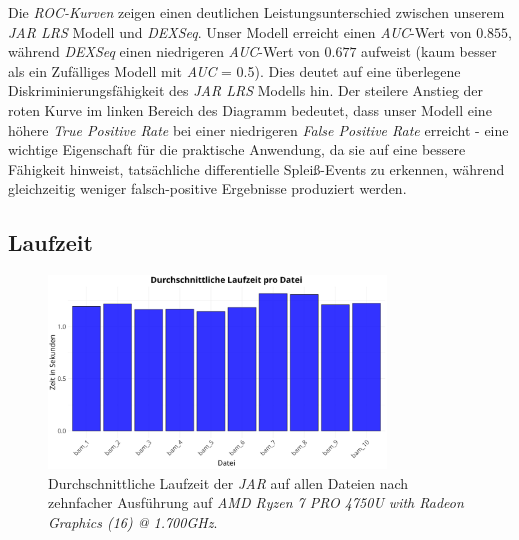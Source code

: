 \documentclass[12pt]{article}
\begin{document}
Die \textit{ROC-Kurven} zeigen einen deutlichen Leistungsunterschied zwischen 
unserem \textit{JAR LRS} Modell und \textit{DEXSeq}. Unser Modell erreicht einen \textit{AUC}-Wert von $0.855$, während
\textit{DEXSeq} einen niedrigeren \textit{AUC}-Wert von $0.677$ aufweist (kaum besser als ein
Zufälliges Modell mit \textit{AUC} = 0.5).
Dies deutet auf eine überlegene Diskriminierungsfähigkeit des \textit{JAR LRS} Modells hin.
Der steilere Anstieg der roten Kurve im linken Bereich des Diagramm bedeutet,
dass unser Modell eine höhere \textit{True Positive Rate} bei einer niedrigeren \textit{False Positive Rate} erreicht 
- eine wichtige Eigenschaft für die praktische Anwendung, da sie auf
eine bessere Fähigkeit hinweist, tatsächliche differentielle Spleiß-Events zu erkennen,
während gleichzeitig weniger falsch-positive Ergebnisse produziert werden.

\subsection{Laufzeit}

\begin{figure}[htpb]
    \centering
    \includegraphics[width=0.8\textwidth]{./plots/time.png}
    \caption{Durchschnittliche Laufzeit der \textit{JAR} auf allen Dateien nach zehnfacher Ausführung auf \textit{AMD Ryzen 7 PRO 4750U with Radeon Graphics (16) @ 1.700GHz}.}
    \label{fig:-plots-time-png}
\end{figure}
\end{document}
